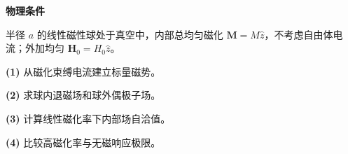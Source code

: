 \textbf{物理条件}\par 半径 \(a\) 的线性磁性球处于真空中，内部总均匀磁化 \(\boldsymbol M=M\hat z\)，不考虑自由体电流；外加均匀 \(\boldsymbol H_0=H_0\hat z\)。
\par\noindent\textbf{(1)} 从磁化束缚电流建立标量磁势。
\par\noindent\textbf{(2)} 求球内退磁场和球外偶极子场。
\par\noindent\textbf{(3)} 计算线性磁化率下内部场自洽值。
\par\noindent\textbf{(4)} 比较高磁化率与无磁响应极限。
